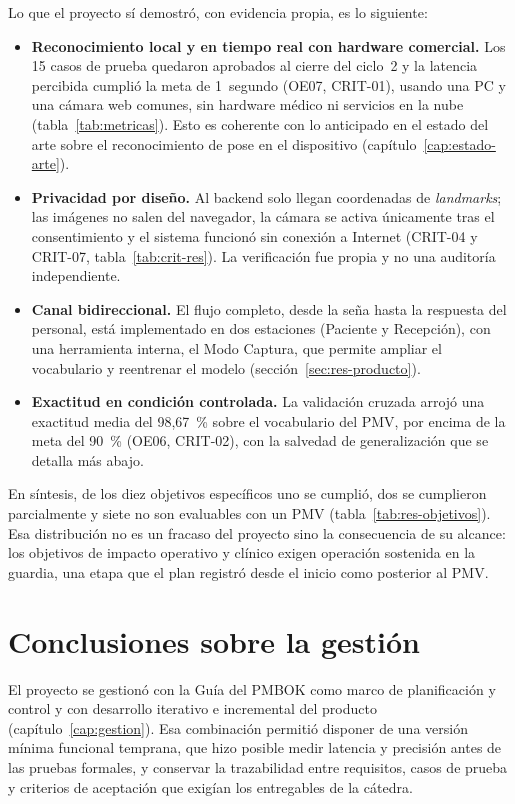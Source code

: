 Lo que el proyecto sí demostró, con evidencia propia, es lo siguiente:
\begin{itemize}
  \item \textbf{Reconocimiento local y en tiempo real con hardware comercial.} Los 15 casos de prueba quedaron aprobados al cierre del ciclo~2 y la latencia percibida cumplió la meta de 1~segundo (OE07, CRIT-01), usando una PC y una cámara web comunes, sin hardware médico ni servicios en la nube (tabla~\ref{tab:metricas}). Esto es coherente con lo anticipado en el estado del arte sobre el reconocimiento de pose en el dispositivo (capítulo~\ref{cap:estado-arte}).
  \item \textbf{Privacidad por diseño.} Al backend solo llegan coordenadas de \emph{landmarks}; las imágenes no salen del navegador, la cámara se activa únicamente tras el consentimiento y el sistema funcionó sin conexión a Internet (CRIT-04 y CRIT-07, tabla~\ref{tab:crit-res}). La verificación fue propia y no una auditoría independiente.
  \item \textbf{Canal bidireccional.} El flujo completo, desde la seña hasta la respuesta del personal, está implementado en dos estaciones (Paciente y Recepción), con una herramienta interna, el Modo Captura, que permite ampliar el vocabulario y reentrenar el modelo (sección~\ref{sec:res-producto}).
  \item \textbf{Exactitud en condición controlada.} La validación cruzada arrojó una exactitud media del 98,67~\% sobre el vocabulario del PMV, por encima de la meta del 90~\% (OE06, CRIT-02), con la salvedad de generalización que se detalla más abajo.
\end{itemize}

En síntesis, de los diez objetivos específicos uno se cumplió, dos se cumplieron parcialmente y siete no son evaluables con un PMV (tabla~\ref{tab:res-objetivos}). Esa distribución no es un fracaso del proyecto sino la consecuencia de su alcance: los objetivos de impacto operativo y clínico exigen operación sostenida en la guardia, una etapa que el plan registró desde el inicio como posterior al PMV.

\section{Conclusiones sobre la gestión}\label{sec:concl-gestion}

El proyecto se gestionó con la Guía del PMBOK como marco de planificación y control y con desarrollo iterativo e incremental del producto (capítulo~\ref{cap:gestion}). Esa combinación permitió disponer de una versión mínima funcional temprana, que hizo posible medir latencia y precisión antes de las pruebas formales, y conservar la trazabilidad entre requisitos, casos de prueba y criterios de aceptación que exigían los entregables de la cátedra.

